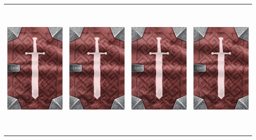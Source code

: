 \documentclass{minimal}
\begin{document}
{\begin{longtable}{llll}
\includegraphics[width=44mm,height=68mm]{./64-151/gh-118-staff-of-elements-back.png} &
\includegraphics[width=44mm,height=68mm]{./64-151/gh-118-staff-of-elements-back.png} &
\includegraphics[width=44mm,height=68mm]{./64-151/gh-117-bloody-axe-back.png} &
\includegraphics[width=44mm,height=68mm]{./64-151/gh-117-bloody-axe-back.png}\\ 

\end{longtable}}
\end{document}
